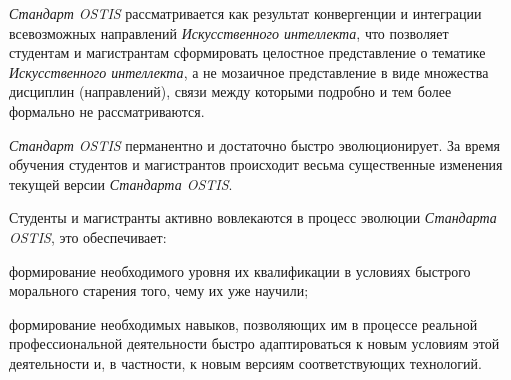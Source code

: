\textit{Стандарт OSTIS} рассматривается как результат конвергенции и интеграции всевозможных направлений \textit{Искусственного интеллекта}, что позволяет студентам и магистрантам сформировать целостное представление о тематике \textit{Искусственного интеллекта}, а не мозаичное представление в виде множества дисциплин (направлений), связи между которыми подробно и тем более формально не рассматриваются.

\textit{Стандарт OSTIS} перманентно и достаточно быстро эволюционирует. За время обучения студентов и магистрантов происходит весьма существенные изменения текущей версии \textit{Стандарта OSTIS}.

Студенты и магистранты активно вовлекаются в процесс эволюции \textit{Стандарта OSTIS}, это обеспечивает:

\begin{textitemize}
	\item формирование необходимого уровня их квалификации в условиях быстрого морального старения того, чему их уже научили;
	\item формирование необходимых навыков, позволяющих им в процессе реальной профессиональной деятельности быстро адаптироваться к новым условиям этой деятельности и, в частности, к новым версиям соответствующих технологий.
\end{textitemize}

